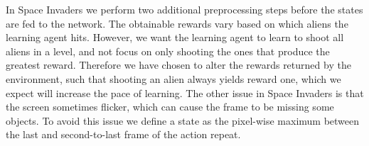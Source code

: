 \documentclass[11pt]{article}
\begin{document}
In Space Invaders we perform two additional preprocessing steps before
the states are fed to the network.
The obtainable rewards vary based on which aliens the learning agent
hits.
However, we want the learning agent to learn to shoot all aliens in a level,
and not focus on only shooting the ones that produce the greatest reward.
Therefore we have chosen to alter the rewards returned by the environment, such that
shooting an alien always yields reward one, which we expect will increase
the pace of learning.
The other issue in Space Invaders is that the screen sometimes flicker,
which can cause the frame to be missing some objects.
To avoid this issue we define a state as the pixel-wise maximum
between the last and second-to-last frame of the action repeat.
\end{document}
